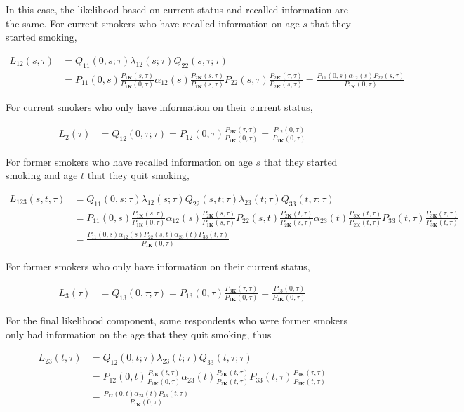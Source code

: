 \documentclass[11pt,a4paper]{article}
\newcommand{\K}{\ensuremath{\bm{K}}}
\begin{document}
In this case, the likelihood based on current status and recalled information are the same.
For current smokers who have recalled information on age $s$ that they started smoking,

\begin{align*}
L_{12}(s,\tau) & = Q_{11}(0,s;\tau)\lambda_{12}(s;\tau)Q_{22}(s,\tau;\tau) \\
& = P_{11}(0,s)\frac{P_{1\K}(s,\tau)}{P_{1\K}(0,\tau)} 
\alpha_{12}(s) \frac{P_{2\K}(s,\tau)}{P_{1\K}(s,\tau)}
P_{22}(s,\tau)\frac{P_{2\K}(\tau,\tau)}{P_{2\K}(s,\tau)}
 = \frac{P_{11}(0,s)\alpha_{12}(s)P_{22}(s,\tau)}{P_{1\K}(0,\tau)}
\end{align*}

For current smokers who only have information on their current status, 

\begin{align*}
L_2(\tau) & = Q_{12}(0,\tau;\tau)  = P_{12}(0,\tau)\frac{P_{2\K}(\tau,\tau)}{P_{1\K}(0,\tau)} 
= \frac{P_{12}(0,\tau)}{P_{1\K}(0,\tau)}  
\end{align*}

For former smokers who have recalled information on age $s$ that they started smoking and age $t$ that they quit smoking,

\begin{align*}
L_{123}(s,t,\tau) & = Q_{11}(0,s;\tau) \lambda_{12}(s;\tau) Q_{22}(s,t;\tau) \lambda_{23}(t;\tau) Q_{33}(t,\tau;\tau) \\
& = P_{11}(0,s)\frac{P_{1\K}(s,\tau)}{P_{1\K}(0,\tau)} 
\alpha_{12}(s) \frac{P_{2\K}(s,\tau)}{P_{1\K}(s,\tau)}
P_{22}(s,t)\frac{P_{2\K}(t,\tau)}{P_{2\K}(s,\tau)}
\alpha_{23}(t) \frac{P_{3\K}(t,\tau)}{P_{2\K}(t,\tau)}
P_{33}(t,\tau)\frac{P_{3\K}(\tau,\tau)}{P_{3\K}(t,\tau)} \\
& = \frac{P_{11}(0,s) \alpha_{12}(s) P_{22}(s,t) \alpha_{23}(t) P_{33}(t,\tau)}{P_{1\K}(0,\tau)}
\end{align*}

For former smokers who only have information on their current status, 

\begin{align*}
L_3(\tau) & = Q_{13}(0,\tau;\tau)  = P_{13}(0,\tau)\frac{P_{3\K}(\tau,\tau)}{P_{1\K}(0,\tau)} 
= \frac{P_{13}(0,\tau)}{P_{1\K}(0,\tau)}  
\end{align*}

For the final likelihood component, some respondents who were former smokers only had information on the age that they quit smoking, thus
 
\begin{align*}
L_{23}(t,\tau) & = Q_{12}(0,t;\tau) \lambda_{23}(t;\tau) Q_{33}(t,\tau;\tau) \\
& = P_{12}(0,t)\frac{P_{2\K}(t,\tau)}{P_{1\K}(0,\tau)} 
\alpha_{23}(t) \frac{P_{3\K}(t,\tau)}{P_{2\K}(t,\tau)}
P_{33}(t,\tau)\frac{P_{3\K}(\tau,\tau)}{P_{3\K}(t,\tau)} \\
& = \frac{P_{12}(0,t) \alpha_{23}(t) P_{33}(t,\tau)}{P_{1\K}(0,\tau)}
\end{align*}
\end{document}
